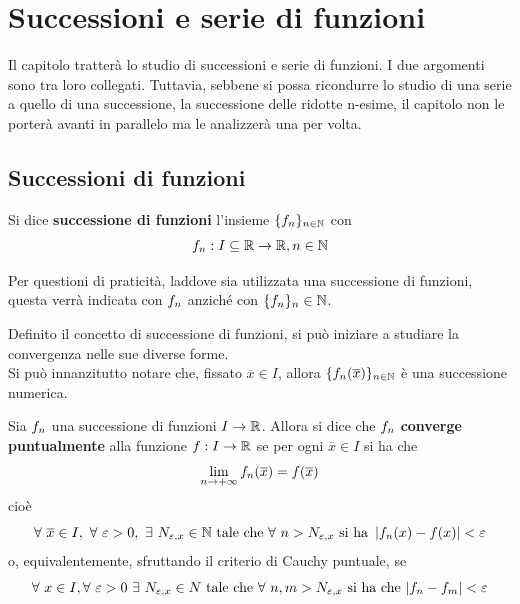\chapter{Successioni e serie di funzioni}
Il capitolo tratterà lo studio di successioni e serie di funzioni. I due argomenti sono tra loro collegati. Tuttavia, sebbene si possa ricondurre lo studio di una serie a quello di una successione, la successione delle ridotte n-esime, il capitolo non le porterà avanti in parallelo ma le analizzerà una per volta.
\section{Successioni di funzioni}
\begin{definition} \label{Def: Successione di funzioni}
     Si dice \textbf{successione di funzioni} l'insieme $\{f_n\}_{n \in \mathbb{N}}$ con
     \begin{equation}
         f_n: I \subseteq \mathbb{R} \to \mathbb{R}, n \in \mathbb{N}
     \end{equation}
\end{definition}
\begin{oss}
    Per questioni di praticità, laddove sia utilizzata una successione di funzioni, questa verrà indicata con $f_n$ anziché con $\{f_n\}_n\in \mathbb{N}$.
\end{oss}
Definito il concetto di successione di funzioni, si può iniziare a studiare la convergenza nelle sue diverse forme.\\
Si può innanzitutto notare che, fissato $\overline{x}\in I$, 
allora $\{f_n(\overline{x})\}_{n \in \mathbb{N}}$ è una successione numerica.
\begin{definition} \label{Def: Convergenza puntuale succ}
    Sia $f_n$ una successione di funzioni $I\to \mathbb{R}$. Allora si dice che $f_n$ \textbf{converge puntualmente} alla funzione $f: I \to \mathbb{R}$ se per ogni $\overline{x} \in I$ si ha che
    \begin{equation}
        \lim_{n \to +\infty} f_n(\overline{x}) = f(\overline{x})
    \end{equation}
    cioè
    \begin{equation}
        \forall\ \overline{x} \in I,\ \forall\ \varepsilon > 0,\ \exists\ N_{\varepsilon, x} \in \N\ \text{tale che}\ \forall\ n> N_{\varepsilon,x}\ \text{si ha}\ \left| \fn(x)-f(x)\right| < \varepsilon
    \end{equation}
    o, equivalentemente, sfruttando il criterio di Cauchy puntuale, se
\begin{equation}
    \forall\ x \in I, \forall\ \varepsilon > 0\ \exists\ N_{\varepsilon, x} \in N\ \text{tale che}\ \forall\ n,m > N_{\varepsilon, x}\ \text{si ha che}\ |\fn - f_m|<\varepsilon
\end{equation}
\end{definition}    
